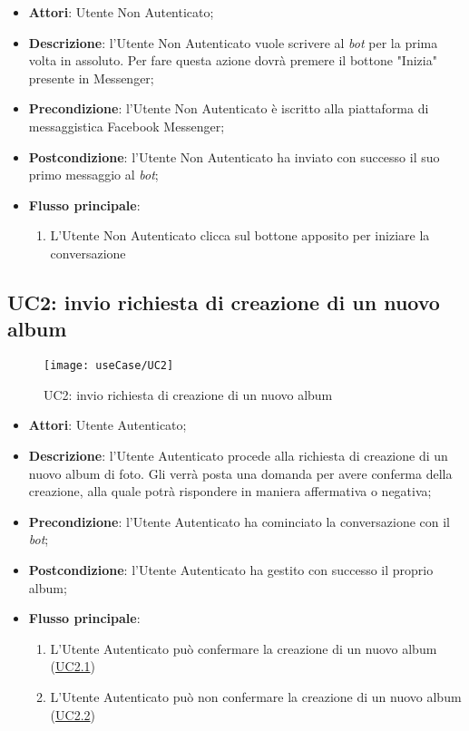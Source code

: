 \begin{itemize}
  \item \textbf{Attori}: Utente Non Autenticato;
  \item \textbf{Descrizione}: l'Utente Non Autenticato vuole scrivere al
\textit{bot} per la prima volta in assoluto. Per fare questa azione dovrà
premere il bottone "Inizia" presente in Messenger;
  \item \textbf{Precondizione}: l'Utente Non Autenticato è iscritto alla
piattaforma di messaggistica Facebook Messenger;
  \item \textbf{Postcondizione}: l'Utente Non Autenticato ha inviato con
successo il suo primo messaggio al \textit{bot};
  \item \textbf{Flusso principale}:
  \begin{enumerate}
    \item L'Utente Non Autenticato clicca sul bottone apposito per iniziare la
conversazione
  \end{enumerate}
\end{itemize}



\newpage

\subsection{UC2: invio richiesta di creazione di un nuovo album}
\label{uc:uc2}
\hypertarget{UC2}{}

\begin{figure}[H]
  \centering
  \texttt{[image: useCase/UC2]}
  \caption{UC2: invio richiesta di creazione di un nuovo album}
\end{figure}

\begin{itemize}
  \item \textbf{Attori}: Utente Autenticato;
  \item \textbf{Descrizione}: l'Utente Autenticato procede alla richiesta di
creazione di un nuovo album di foto. Gli verrà posta una domanda per avere
conferma della creazione, alla quale potrà rispondere in maniera affermativa o
negativa;
  \item \textbf{Precondizione}: l'Utente Autenticato ha cominciato la
conversazione con il \textit{bot};
  \item \textbf{Postcondizione}: l'Utente Autenticato ha gestito con successo
il proprio album;
  \item \textbf{Flusso principale}:
  \begin{enumerate}
    \item L'Utente Autenticato può confermare la creazione di un nuovo album
(\hyperlink{UC2.1}{UC2.1})
    \item L'Utente Autenticato può non confermare la creazione di un nuovo album
(\hyperlink{UC2.2}{UC2.2})
  \end{enumerate}
\end{itemize}

